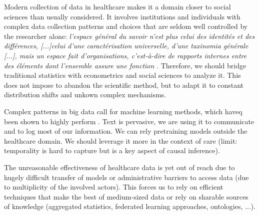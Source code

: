 \documentclass[french,12pt,twoside,a4paper]{book}
\begin{document}
Modern collection of data in healthcare makes it a domain closer to social
sciences than usually considered. It involves institutions and individuals with
complex data collection patterns and choices that are seldom well controlled by
the researcher alone: \textit{l'espace général du savoir n'est plus celui des
identités et des différences, [...]celui d'une caractérisation universelle,
d'une taxinomia générale [...], mais un espace fait d'organisations,
c'est-à-dire de rapports internes entre des éléments dont l'ensemble assure une
fonction} \citep{foucault1990mots}. Therefore, we should bridge traditional
statistics with econometrics and social sciences to analyze it. This does not
impose to abandon the scientific method, but to adapt it to constant
distribution shifts and unkown complex mechanisms.

Complex patterns in big data call for machine learning methods, which haveq been shown to
highly perform . Text is pervasive, we are using it to communicate and to log
most of our information. We can rely pretraining models outside the healthcare
domain. We should leverage it more in the context of care (limit: temporality is
hard to capture but is a key aspect of causal inference).

The unreasonable effectiveness of healthcare data is yet out of reach due to
hugely difficult transfer of models or administrative barriers to access data
(due to multiplicity of the involved actors). This forces us to rely on
efficient techniques that make the best of medium-sized data or rely on sharable
sources of knowledge (aggregated statistics, federated learning approaches,
ontologies, ...).

\clearpage
%
%
%
\begin{multicols}{2}
  \printbibliography
\end{multicols}
\end{document}
